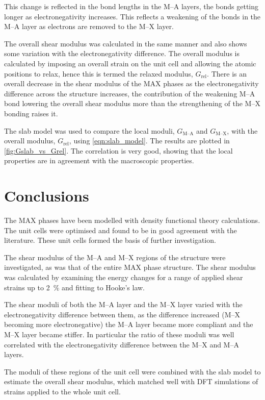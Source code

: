 This change is reflected in the bond lengths in the M--A layers, the bonds getting longer as electronegativity increases. This reflects a weakening of the bonds in the M--A layer as electrons are removed to the M--X layer.




The overall shear modulus was calculated in the same manner and also shows some variation with the electronegativity difference. The overall modulus is calculated by imposing an overall strain on the unit cell and allowing the atomic positions to relax, hence this is termed the relaxed modulus, $G_{\text{rel}}$. There is an overall decrease in the shear modulus of the MAX phases as the electronegativity difference across the structure increases, the contribution of the weakening M--A bond lowering the overall shear modulus more than the strengthening of the M--X bonding raises it.


The slab model was used to compare the local moduli, $G_{\text{M--A}}$ and $G_{\text{M--X}}$,  with the overall modulus, $G_{\text{rel}}$, using \autoref{eqn:slab_model}. The results are plotted in \autoref{fig:Gslab_vs_Grel}. The correlation is very good, showing that the local properties are in agreement with the macroscopic properties.



\section{Conclusions}

The MAX phases have been modelled with density functional theory calculations. The unit cells were optimised and found to be in good agreement with the literature. These unit cells formed the basis of further investigation.

The shear modulus of the M--A and M--X regions of the structure were investigated, as was that of the entire MAX phase structure. The shear modulus was calculated by examining the energy changes for a range of applied shear strains up to \SI{2}{\percent} and fitting to Hooke's law.

The shear moduli of both the M--A layer and the M--X layer varied with the electronegativity difference between them, as the difference increased (M--X becoming more electronegative) the M--A layer became more compliant and the M--X layer became stiffer. In particular the ratio of these moduli was well correlated with the electronegativity difference between the M--X and M--A layers.

The moduli of these regions of the unit cell were combined with the slab model to estimate the overall shear modulus, which matched well with DFT simulations of strains applied to the whole unit cell.





























